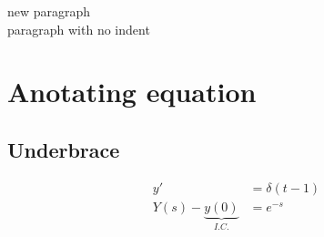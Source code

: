 \documentclass{article}
\begin{document}
new paragraph\\

\noindent paragraph with no indent
\vfill
\lipsum[1]

\newpage

\section{Anotating equation}
\subsection{Underbrace}
\begin{align}
    y' &=\delta(t-1) \\
    Y(s)-\underbrace{y(0)}_{I.C.} &= e^{-s}
\end{align}
\end{document}
